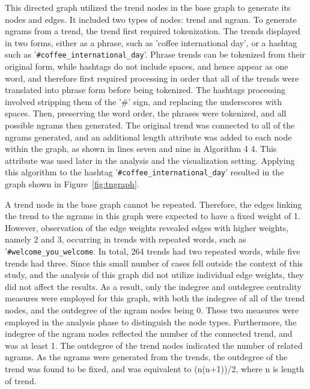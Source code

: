\documentclass[conference]{IEEEtran}
\begin{document}
This directed graph utilized the trend nodes in the base graph to generate its nodes and 
edges. It included two types of nodes: trend and ngram. To generate ngrams from a 
trend, the trend first required tokenization. The trends displayed in two forms, either as 
a phrase, such as 'coffee international day', or a hashtag such as '{\texttt{\#coffee\_international\_day}}'. 
Phrase trends can be tokenized from their original form, while hashtags do not include spaces, 
and hence appear as one word, and therefore first required processing in order that all of the 
trends were translated into phrase form before being tokenized. The hashtags processing 
involved stripping them of the '\#' sign, and replacing the underscores with spaces. Then, 
preserving the word order, the phrases were tokenized, and all possible ngrams then generated. 
The original trend was connected to all of the ngrams generated, and an additional length attribute 
was added to each node within the graph, as shown in lines seven and nine in Algorithm ‎4 4. 
This attribute was used later in the analysis and the visualization setting. Applying this 
algorithm to the hashtag '{\texttt{\#coffee\_international\_day}}' resulted in the graph shown 
in Figure~\ref{fig:tngraph}.


A trend node in the base graph cannot be repeated. Therefore, the edges linking 
the trend to the ngrams in this graph were expected to have a fixed weight of 1. 
However, observation of the edge weights revealed edges with higher weights, namely 
2 and 3, occurring in trends with repeated words, such as '{\texttt{\#welcome\_you\_welcome}}.
In total, 264 trends had two repeated words, while five trends had three. Since this small number 
of cases fell outside the context of this study, and the analysis of this graph did not utilize individual 
edge weights, they did not affect the results. As a result, only the indegree and outdegree 
centrality measures were employed for this graph, with both the indegree of all of the trend nodes, 
and the outdegree of the ngram nodes being 0. These two measures were employed in the analysis 
phase to distinguish the node types. Furthermore, the indegree of the ngram nodes reflected the 
number of the connected trend, and was at least 1. The outdegree of the trend nodes indicated 
the number of related ngrams. As the ngrams were generated from the trends, the outdegree of 
the trend was found to be fixed, and was equivalent to (n(n+1))/2, where n is length of trend.
\end{document}
